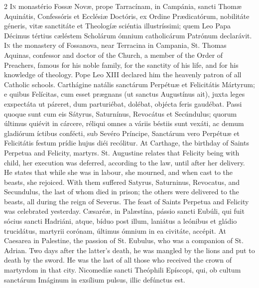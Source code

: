 \begin{paracol}{2}
\lettrine[lines=2]{I}{n} monastério Fossæ Novæ, prope Tarracínam, in 
 Campánia, sancti Thomæ Aquinátis, Confessóris et Ecclésiæ Doctóris, ex 
 Ordine Prædicatórum, nobilitáte géneris, vitæ sanctitáte et Theologíæ 
 sciéntia illustríssimi; quem Leo Papa Décimus tértius cæléstem Scholárum 
 ómnium catholicárum Patrónum declarávit.
\switchcolumn
{}
\lettrine[lines=2]{I}{n} the monastery of Fossanova, near Terracina in Campania, St. Thomas 
 Aquinas, confessor and doctor of the Church, a member of the Order of 
 Preachers, famous for his noble family, for the sanctity of his life, and 
 for his knowledge of theology. Pope Leo XIII declared him the heavenly 
 patron of all Catholic schools.
\switchcolumn*
{}
Carthágine natális sanctárum Perpétuæ et 
 Felicitátis Mártyrum; e quibus Felícitas, cum esset prægnans (ut sanctus 
 Augustínus ait), juxta leges exspectáta ut páreret, dum parturiébat, dolébat, 
 objécta feris gaudébat. Passi quoque sunt cum eis Sátyrus, Saturnínus, 
 Revocátus et Secúndulus; quorum últimus quiévit in cárcere, réliqui omnes a 
 váriis béstiis sunt vexáti, ac demum gladiórum íctibus confécti, sub Sevéro 
 Príncipe, Sanctárum vero Perpétuæ et Felicitátis festum prídie hujus diéi 
 recólitur.
\switchcolumn
{}
At Carthage, the birthday of Saints Perpetua and Felicity, martyrs. 
 St. Augustine relates that Felicity being with child, her execution was 
 deferred, according to the law, until after her delivery. He states 
 that while she was in labour, she mourned, and when cast to the beasts, she 
 rejoiced. With them suffered Satyrus, Saturninus, Revocatus, and 
 Secundulus, the last of whom died in prison; the others were delivered to 
 the beasts, all during the reign of Severus. The feast of Saints 
 Perpetua and Felicity was celebrated yesterday.
\switchcolumn*
{}
Cæsaréæ, in Palæstína, pássio sancti Eubúli, 
 qui fuit sócius sancti Hadriáni, atque, bíduo post illum, laniátus a 
 leónibus et gládio trucidátus, martyrii corónam, últimus ómnium in ea 
 civitáte, accépit.
\switchcolumn
{}
At Caesarea in Palestine, the passion of St. Eubulus, who was a companion of 
 St. Adrian. Two days after the latter's death, he was mangled by the 
 lions and put to death by the sword. He was the last of all those who 
 received the crown of martyrdom in that city.
\switchcolumn*
{}
Nicomedíæ sancti Theóphili Epíscopi, qui, ob 
 cultum sanctárum Imáginum in exsílium pulsus, illic defúnctus est.

\end{paracol}
